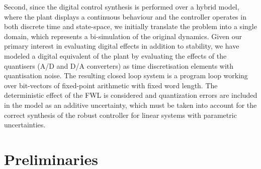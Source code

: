 \documentclass{sig-alternate-05-2015}
\begin{document}
Second, since the digital control synthesis is performed over a hybrid model, 
where the plant displays a continuous behaviour and the controller operates in
both discrete time and state-space, we initially translate the problem into
a single domain, which represents a bi-simulation of the original dynamics. 
Given our primary interest in evaluating digital effects in addition to
stability, we have modeled a digital equivalent of the plant by evaluating
the effects of the quantisers (A/D and D/A converters) as time
discretisation elements with quantisation noise.  The resulting closed loop
system is a program loop working over bit-vectors of fixed-point arithmetic
with fixed word length.  The deterministic effect of the FWL is considered
and quantization errors are included in the model as an additive uncertainty, 
which must be taken into account for the correct synthesis of the robust controller
for linear systems with parametric uncertainties.





\section{Preliminaries}
\end{document}
